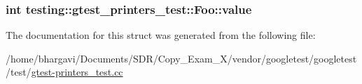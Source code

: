 \subsubsection[{\texorpdfstring{value}{value}}]{\setlength{\rightskip}{0pt plus 5cm}int testing\+::gtest\+\_\+printers\+\_\+test\+::\+Foo\+::value}\hypertarget{structtesting_1_1gtest__printers__test_1_1_foo_a8171a69191d34071ea4448d2dda501ec}{}\label{structtesting_1_1gtest__printers__test_1_1_foo_a8171a69191d34071ea4448d2dda501ec}


The documentation for this struct was generated from the following file\+:\begin{DoxyCompactItemize}
\item 
/home/bhargavi/\+Documents/\+S\+D\+R/\+Copy\+\_\+\+Exam\+\_\+X/vendor/googletest/googletest/test/\hyperlink{gtest-printers__test_8cc}{gtest-\/printers\+\_\+test.\+cc}\end{DoxyCompactItemize}
